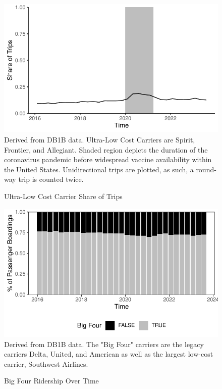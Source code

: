 \documentclass{article}
\begin{document}
\begin{appendices}
	\begin{figure}
		\caption{Ultra-Low Cost Carrier Share of Trips}
		\label{fig:ULCC_Trips}
		\includegraphics[width = \linewidth]{ULCC_Share}
		\footnotesize{Derived from DB1B data. Ultra-Low Cost Carriers are Spirit, Frontier, and Allegiant. Shaded region depicts the duration of the coronavirus pandemic before widespread vaccine availability within the United States. Unidirectional trips are plotted, as such, a round-way trip is counted twice.}
	\end{figure}
	
	\begin{figure}[h]
		\caption{Big Four Ridership Over Time}
		\label{fig:BigFour_Ridership}
		\includegraphics{BigFour_Ridership_Graph.pdf}
		\footnotesize{Derived from DB1B data. The "Big Four" carriers are the legacy carriers Delta, United, and American as well as the largest low-cost carrier, Southwest Airlines.}
	\end{figure}


\end{appendices}
\end{document}
